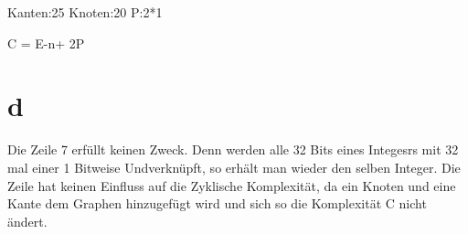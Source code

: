 Kanten:25
Knoten:20
P:2*1

C = E-n+ 2P

\section*{d}
Die Zeile 7 erfüllt keinen Zweck. Denn werden alle 32 Bits eines Integesrs mit 32 mal einer 1 Bitweise Undverknüpft, so erhält man wieder den selben Integer.
Die Zeile hat keinen Einfluss auf die Zyklische Komplexität, da ein Knoten und eine Kante dem Graphen hinzugefügt wird und sich so die Komplexität C nicht ändert.